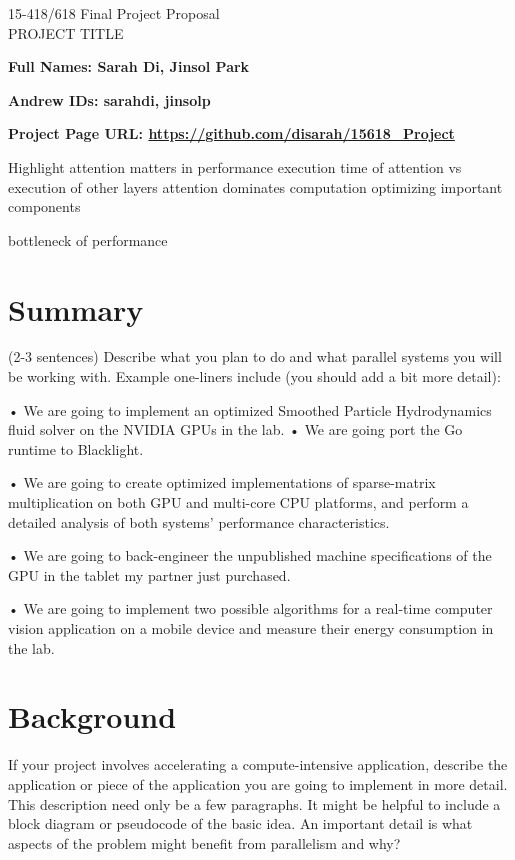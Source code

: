 \documentclass[11pt]{article}
\begin{document}
\begin{center}
\LARGE
15-418/618 \thisterm{} Final Project Proposal
\\ 
PROJECT TITLE
\end{center}
\begin{flushright}
{\large\bf Full Names: Sarah Di, Jinsol Park\makebox[2in][l]{

}}

{\large\bf Andrew IDs: sarahdi, jinsolp\makebox[2in][l]{\tt

}}
\end{flushright}

{\large\bf Project Page URL: \url{https://github.com/disarah/15618\_Project}\makebox[2in][l]{

}}

Highlight attention matters in performance
execution time of attention vs execution of other layers
attention dominates computation
optimizing important components

bottleneck of performance

\section{Summary}
(2-3 sentences) Describe what you plan to do and what parallel systems you will be working with. Example one-liners include (you should add a bit more detail):

• We are going to implement an optimized Smoothed Particle Hydrodynamics fluid solver on the NVIDIA GPUs in the lab.
• We are going port the Go runtime to Blacklight.

• We are going to create optimized implementations of sparse-matrix multiplication on both GPU and multi-core CPU platforms, and perform a detailed analysis of both systems’ performance characteristics.

• We are going to back-engineer the unpublished machine specifications of the GPU in the tablet my partner just purchased.

• We are going to implement two possible algorithms for a real-time computer vision application on a mobile device and measure their energy consumption in the lab.

\section{Background}
If your project involves accelerating a compute-intensive application, describe the application or piece of the application you are going to implement in more detail. This description need only be a few paragraphs. It might be helpful to include a block diagram or pseudocode of the basic idea. An important detail is what aspects of the problem might benefit from parallelism and why?
\end{document}
